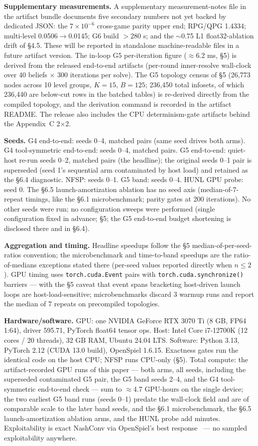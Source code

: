 \documentclass[11pt]{article}
\begin{document}
\textbf{Supplementary measurements.} A supplementary measurement-notes file in the
artifact bundle documents five secondary numbers not yet backed by dedicated JSON:
the $7\times10^{-6}$ cross-game parity upper end; RPG/QPG 1.4334; multi-level
0.0506$\to$0.0145; G6 build $>$280 s; and the $\sim$0.75 L1 float32-ablation drift of
\S4.5. These will be reported in standalone machine-readable files in a future artifact
version. The in-loop G5 per-iteration figure ($\approx$6.2 ms, \S5) is derived from the
released end-to-end artifacts (per-round inner-resolve wall-clock over 40 beliefs
$\times$ 300 iterations per solve). The G5 topology census of \S5 (26,773 nodes across
10 level groups, $K{=}15$, $B{=}125$; 236,450 total infosets, of which 236,440 are
below-cut rows in the batched tables) is re-derived directly from the compiled topology,
and the derivation command is recorded in the artifact README. The release also includes
the CPU determinism-gate artifacts behind the Appendix~C 2$\times$2.

\textbf{Seeds.} G4 end-to-end: seeds 0--4, matched pairs (same seed drives both arms).
G4 tool-symmetric end-to-end: seeds 0--4, matched pairs. G5 end-to-end: quiet-host
re-run seeds 0--2, matched pairs (the headline); the original seeds 0--1 pair is
superseded (seed 1's sequential arm contaminated by host load) and retained as the
\S6.4 diagnostic. NFSP: seeds 0--1. G5 band: seeds 0--4. HUNL GPU probe: seed 0. The
\S6.5 launch-amortization ablation has no seed axis (median-of-7-repeat timings, like
the \S6.1 microbenchmark; parity gates at 200 iterations). No other seeds were run; no
configuration sweeps were performed (single configuration fixed in advance; \S5; the G5
end-to-end budget shortening is disclosed there and in \S6.4).

\textbf{Aggregation and timing.} Headline speedups follow the \S5
median-of-per-seed-ratios convention; the microbenchmark and time-to-band speedups are
the ratio-of-medians exceptions stated there (per-seed values reported directly when $n
\le 2$). GPU timing uses \texttt{torch.cuda.Event} pairs with
\texttt{torch.cuda.synchronize()} barriers --- with the \S5 caveat that event spans
bracketing host-driven launch loops are host-load-sensitive; microbenchmarks discard 3
warmup runs and report the median of 7 repeats on precompiled topologies.

\textbf{Hardware/software.} GPU: one NVIDIA GeForce RTX 3070 Ti (8 GB, FP64 1:64),
driver 595.71, PyTorch float64 tensor ops. Host: Intel Core i7-12700K (12 cores / 20
threads), 32 GB RAM, Ubuntu 24.04 LTS. Software: Python 3.13, PyTorch 2.12 (CUDA 13.0
build), OpenSpiel 1.6.15. Exactness gates run the identical code on the host CPU; NFSP
runs CPU-only (\S5). Total compute: the artifact-recorded GPU runs of this paper ---
both arms, all seeds, including the superseded contaminated G5 pair, the G5 band
seeds 2--4, and the G4 tool-symmetric end-to-end check --- sum to $\approx$4.7
GPU-hours on the single device; the two earliest G5
band runs (seeds 0--1) predate the wall-clock field and are of comparable scale to the
later band seeds, and the \S6.1 microbenchmark, the \S6.5 launch-amortization ablation
arms, and the HUNL probe add minutes.
Exploitability is exact NashConv via OpenSpiel's best response~\citep{Lanctot2019} ---
no sampled exploitability anywhere.
\end{document}

